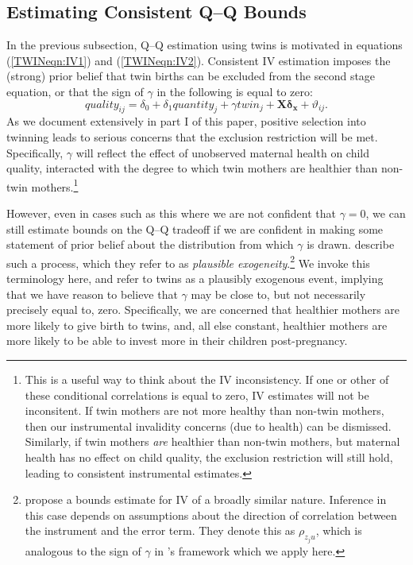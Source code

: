 \documentclass[subeqn]{article}
\begin{document}
\begin{spacing}{1.4}
\subsection{Estimating Consistent Q--Q Bounds}
\label{TWINscn:gamma}
In the previous subsection, Q--Q estimation using twins is motivated in equations
(\ref{TWINeqn:IV1}) and (\ref{TWINeqn:IV2}).  Consistent IV estimation imposes
the (strong) prior belief that twin births can be excluded from the second stage
equation, or that the sign of $\gamma$ in the following is equal to zero:
\begin{equation}
  \label{TWINeqn:Conley}
  quality_{ij}=\delta_0 + \delta_1 quantity_j + \gamma twin_j + \bm{X}\bm{\delta_x} + \vartheta_{ij}.
\end{equation}
As we document extensively in part I of this paper, positive selection into
twinning leads to serious concerns that the exclusion restriction will be met.
Specifically, $\gamma$ will reflect the effect of unobserved maternal health
on child quality, interacted with the degree to which twin mothers are healthier
than non-twin mothers.\footnote{This is a useful way to think about the IV
  inconsistency. If one or other of these conditional correlations is equal to zero,
  IV estimates will not be inconsitent.  If twin mothers are not more healthy than
  non-twin mothers, then our instrumental invalidity concerns (due to health) can be
  dismissed. Similarly, if twin mothers \emph{are} healthier than non-twin mothers,
  but maternal health has no effect on child quality, the exclusion restriction will
  still hold, leading to consistent instrumental estimates.}

However, even in cases such as this where we are not confident that $\gamma=0$,
we can still estimate bounds on the Q--Q tradeoff if we are confident in making
some statement of prior belief about the distribution from which $\gamma$ is
drawn.  \citet{Conleyetal2012} describe such a process, which they refer to as
\emph{plausible exogeneity}.\footnote{\citet{NevoRosen2012} propose a bounds
  estimate for IV of a broadly similar nature.  Inference in this case depends on
  assumptions about the direction of correlation between the instrument and the
  error term. They denote this as $\rho_{z_{j}u}$, which is analogous to the sign
  of $\gamma$ in \citeauthor{Conleyetal2012}'s framework which we apply here.} We
invoke this terminology here, and refer to twins as a plausibly exogenous event,
implying that we have reason to believe that $\gamma$ may be close to, but not
necessarily precisely equal to, zero. Specifically, we are concerned that
healthier mothers are more likely to give birth to twins, and, all else
constant, healthier mothers are more likely to be able to invest more in their
children post-pregnancy.


\end{spacing}
\end{document}
